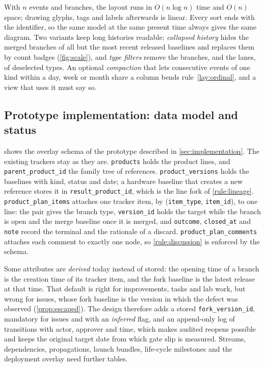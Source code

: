 With $n$ events and branches, the layout runs in $O(n \log n)$ time and
$O(n)$ space; drawing glyphs, tags and labels afterwards is linear. Every
sort ends with the identifier, so the same model at the same present time
always gives the same diagram. Two variants keep long histories readable:
\emph{collapsed history} hides the merged branches of all but the most
recent released baselines and replaces them by count badges
(\cref{fig:scale}), and \emph{type filters} remove the branches, and the
lanes, of deselected types. An optional \emph{compaction} that lets
consecutive events of one kind within a day, week or month share a column
bends rule~\ref{lay:ordinal}, and a view that uses it must say so.

\subsection{Prototype implementation: data model and status}
\label{app:impl}
\label{sec:impl-datamodel}

 shows the overlay schema of the prototype described
in \cref{sec:implementation}. The existing trackers stay as they are.
\texttt{products} holds the product lines, and \texttt{parent\_product\_id}
the family tree of references. \texttt{product\_versions} holds the
baselines with kind, status and date; a hardware baseline that creates a
new reference stores it in \texttt{result\_product\_id}, which is the line
fork of \cref{rule:lineage}. \texttt{product\_plan\_items} attaches one
tracker item, by (\texttt{item\_type}, \texttt{item\_id}), to one line:
the pair gives the branch type, \texttt{version\_id} holds the target
while the branch is open and the merge baseline once it is merged, and
\texttt{outcome}, \texttt{closed\_at} and \texttt{note} record the terminal
and the rationale of a discard. \texttt{product\_plan\_comments} attaches
each comment to exactly one node, so \cref{rule:discussion} is enforced by
the schema.



Some attributes are \emph{derived} today instead of stored: the opening
time of a branch is the creation time of its tracker item, and the fork
baseline is the latest release at that time. That default is right for
improvements, tasks and lab work, but wrong for issues, whose fork
baseline is the version in which the defect was observed
(\cref{prop:escaped}). The design therefore adds a stored
\texttt{fork\_version\_id}, mandatory for issues and with an
\emph{inferred} flag, and an append-only log of transitions with actor,
approver and time, which makes audited reopens possible and keeps the
original target date from which gate slip is measured. Streams,
dependencies, propagations, launch bundles, life-cycle milestones and the
deployment overlay need further tables.

